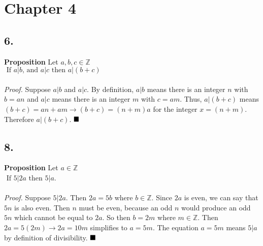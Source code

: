 \documentclass[12pt]{article}
\begin{document}
\begin{minipage}[t]{0.45\textwidth}



\section*{Chapter 4}
\subsection*{6.}
\textbf{Proposition} Let $ a,b,c \in \mathbb{Z} $\\
$ \text{ If } a|b \text{, and } a|c\text{ then } a|(b+c)$\\\\
\textit{Proof.} Suppose $ a|b $ and $ a|c.$
By definition, $ a|b $ means there is an integer $ n $ with $ b=an $ and  $ a|c $ means there is an integer $ m $ with $ c=am $. Thus, $ a|(b+c) $ means $ (b+c) = an+am \rightarrow (b+c)= (n+m)a$ for the integer $ x=(n+m) $.
Therefore $ a|(b+c). $
$ \hfill\blacksquare $ 

\subsection*{8.}
\textbf{Proposition} Let $ a\in \mathbb{Z} $\\
$ \text{ If } 5|2a \text{ then } 5|a$.\\\\
\textit{Proof.} Suppose
$ 5|2a $. Then $ 2a=5b$ where $ b\in \mathbb{Z}$. Since $ 2a $ is even, we can say that $ 5n $ is also even. Then $ n $ must be even, because an odd $ n $ would produce an odd $ 5n $ which cannot be equal to $ 2a $. So then $ b=2m $ where $  m\in \mathbb{Z}$. Then $ 2a=5(2m) \rightarrow 2a=10m $ simplifies to $ a=5m. $ The equation $ a=5m $ means $ 5|a $ by definition of divisibility. 
$ \hfill\blacksquare $ 




\end{minipage}
\pagebreak


\end{document}
